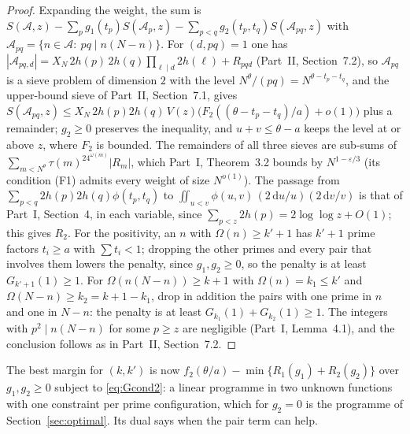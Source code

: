 \documentclass[11pt]{amsart}
\theoremstyle{remark}
\newcommand{\cA}{\mathcal{A}}
\newcommand{\e}{\varepsilon}
\newcommand{\dd}{\mathrm{d}}
\begin{document}
\begin{proof}
Expanding the weight, the sum is $S(\cA,z)-\sum_pg_1(t_p)S(\cA_p,z)-\sum_{p<q}g_2(t_p,t_q)S(\cA_{pq},z)$ with $\cA_{pq}=\{n\in\cA:\ pq\mid n(N-n)\}$. For $(d,pq)=1$ one has $|\cA_{pq,d}|=X_N\,2h(p)\,2h(q)\prod_{\ell\mid d}2h(\ell)+R_{pqd}$ (Part~II, Section~7.2), so $\cA_{pq}$ is a sieve problem of dimension $2$ with the level $N^\theta/(pq)=N^{\theta-t_p-t_q}$, and the upper-bound sieve of Part~II, Section~7.1, gives $S(\cA_{pq},z)\le X_N\,2h(p)2h(q)\,V(z)\bigl(F_2((\theta-t_p-t_q)/a)+o(1)\bigr)$ plus a remainder; $g_2\ge0$ preserves the inequality, and $u+v\le\theta-a$ keeps the level at or above $z$, where $F_2$ is bounded. The remainders of all three sieves are sub-sums of $\sum_{m<N^\theta}\tau(m)^24^{\omega(m)}|R_m|$, which Part~I, Theorem~3.2 bounds by $N^{1-\e/3}$ (its condition (F1) admits every weight of size $N^{o(1)}$). The passage from $\sum_{p<q}2h(p)2h(q)\phi(t_p,t_q)$ to $\iint_{u<v}\phi(u,v)\,(2\,\dd u/u)(2\,\dd v/v)$ is that of Part~I, Section~4, in each variable, since $\sum_{p<z}2h(p)=2\log\log z+O(1)$; this gives $R_2$. For the positivity, an $n$ with $\Omega(n)\ge k'+1$ has $k'+1$ prime factors $t_i\ge a$ with $\sum t_i<1$; dropping the other primes and every pair that involves them lowers the penalty, since $g_1,g_2\ge0$, so the penalty is at least $G_{k'+1}(1)\ge1$. For $\Omega(n(N-n))\ge k+1$ with $\Omega(n)=k_1\le k'$ and $\Omega(N-n)\ge k_2=k+1-k_1$, drop in addition the pairs with one prime in $n$ and one in $N-n$: the penalty is at least $G_{k_1}(1)+G_{k_2}(1)\ge1$. The integers with $p^2\mid n(N-n)$ for some $p\ge z$ are negligible (Part~I, Lemma~4.1), and the conclusion follows as in Part~II, Section~7.2.
\end{proof}

The best margin for $(k,k')$ is now $f_2(\theta/a)-\min\{R_1(g_1)+R_2(g_2)\}$ over $g_1,g_2\ge0$ subject to \eqref{eq:Gcond2}: a linear programme in two unknown functions with one constraint per prime configuration, which for $g_2=0$ is the programme of Section~\ref{sec:optimal}. Its dual says when the pair term can help.
\end{document}
